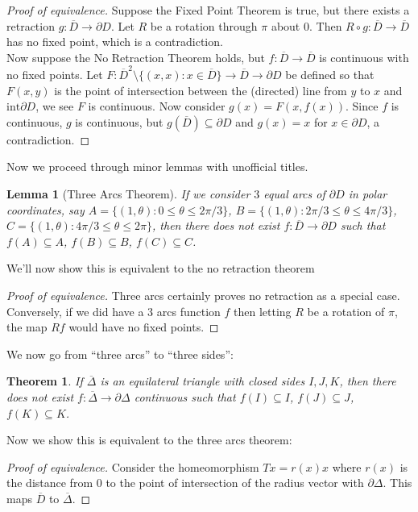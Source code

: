 \documentclass[a4paper, 10pt, twocolumn]{amsart}
\newtheorem*{theorem}{Theorem}
\newtheorem*{lemma}{Lemma}
\theoremstyle{definition}
\newcommand{\sbs}[0]{\subseteq}
\newcommand{\1}{\mathbbm{1}}
\newcommand{\interior}{\text{int}}
\begin{document}
\begin{proof}[Proof of equivalence]
    Suppose the Fixed Point Theorem is true, but there exists a retraction $g: \overline{D} \to \partial D$. Let $R$ be a rotation through $\pi$ about $0$. Then $R \circ g: \overline{D} \to \overline{D}$ has no fixed point, which is a contradiction.\\
    
    Now suppose the No Retraction Theorem holds, but $f: \overline{D} \to \overline{D}$ is continuous with no fixed points. Let $F: \overline{D}^2\setminus \{(x,x):x \in \overline{D}\} \to \overline{D} \to \partial D$ be defined so that $F(x,y)$ is the point of intersection between the (directed) line from $y$ to $x$ and $\interior \partial D$, we see $F$ is continuous. Now consider $g(x)= F(x,f(x))$. Since $f$ is continuous, $g$ is continuous, but $g(\overline{D}) \sbs \partial D$ and $g(x) = x$ for $x \in \partial D$, a contradiction. 
\end{proof}

Now we proceed through minor lemmas with unofficial titles.

\begin{lemma}[Three Arcs Theorem]
    If we consider $3$ equal arcs of $\partial D$ in polar coordinates, say $A = \{(1,\theta): 0\le \theta \le 2\pi/3\}$, $B = \{(1,\theta): 2\pi/3 \le \theta \le 4\pi/3\}$, $C = \{(1,\theta): 4\pi/3\le \theta \le 2\pi\}$, then there does not exist $f: \overline{D} \to \partial D$ such that $f(A) \sbs A$, $f(B) \sbs B$, $f(C) \sbs C$. 
\end{lemma}

We'll now show this is equivalent to the no retraction theorem \begin{proof}[Proof of equivalence]
    Three arcs certainly proves no retraction as a special case. Conversely, if we did have a $3$ arcs function $f$ then letting $R$ be a rotation of $\pi$, the map $Rf$ would have no fixed points. 
\end{proof}



We now go from ``three arcs'' to ``three sides'':

\begin{theorem}
    If $\overline{\Delta}$ is an equilateral triangle with closed sides $I,J,K$, then there does not exist $f: \overline{\Delta} \to \partial \Delta$ continuous such that $f(I) \sbs I$, $f(J) \sbs J$, $f(K) \sbs K$. 
\end{theorem}

Now we show this is equivalent to the three arcs theorem:
\begin{proof}[Proof of equivalence]
    Consider the homeomorphism $Tx = r(x)x$ where $r(x)$ is the distance from $0$ to the point of intersection of the radius vector with $\partial \Delta$. This maps $\overline{D}$ to $\overline{\Delta}$. 
\end{proof}
\end{document}
